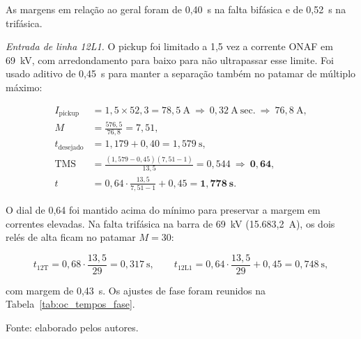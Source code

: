As margens em relação ao geral foram de 0,40~s na falta bifásica e de 0,52~s na trifásica.

\textit{Entrada de linha 12L1.} O pickup foi limitado a 1,5 vez a corrente ONAF em 69~kV, com arredondamento para baixo para não ultrapassar esse limite. Foi usado aditivo de 0,45~s para manter a separação também no patamar de múltiplo máximo:

\begin{equation}
    \begin{aligned}
        I_{\mathrm{pickup}}&=1{,}5\times52{,}3=78{,}5~\mathrm{A}
            \ \Rightarrow\ 0{,}32~\mathrm{A~sec.}
            \ \Rightarrow\ 76{,}8~\mathrm{A},\\
        M&=\frac{576{,}5}{76{,}8}=7{,}51,\\
        t_{\mathrm{desejado}}&=1{,}179+0{,}40=1{,}579~\mathrm{s},\\
        \mathrm{TMS}&=\frac{(1{,}579-0{,}45)(7{,}51-1)}{13{,}5}=0{,}544
            \ \Rightarrow\ \mathbf{0{,}64},\\
        t&=0{,}64\cdot\frac{13{,}5}{7{,}51-1}+0{,}45=\mathbf{1{,}778~s}.
    \end{aligned}
    \label{eq:oc_51_entrada}
\end{equation}

O dial de 0,64 foi mantido acima do mínimo para preservar a margem em correntes elevadas. Na falta trifásica na barra de 69~kV (15.683,2~A), os dois relés de alta ficam no patamar $M=30$:

\begin{equation}
    t_{\mathrm{12T}}=0{,}68\cdot\frac{13{,}5}{29}=0{,}317~\mathrm{s},
    \qquad
    t_{\mathrm{12L1}}=0{,}64\cdot\frac{13{,}5}{29}+0{,}45=0{,}748~\mathrm{s},
    \label{eq:oc_51_patamar_at}
\end{equation}

com margem de 0,43~s. Os ajustes de fase foram reunidos na Tabela~\ref{tab:oc_tempos_fase}.

\begin{table}[htbp]
    \centering
    \caption{Ajustes C2 e tempos de fase para a corrente máxima de referência de média tensão.}
    \label{tab:oc_tempos_fase}
    \par\vspace{2pt}
    {\small Fonte: elaborado pelos autores.}
\end{table}

